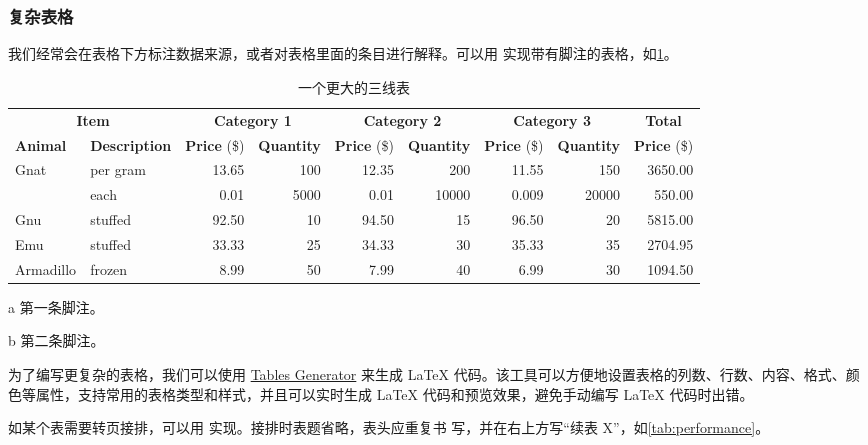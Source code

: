 \subsubsection{复杂表格}

我们经常会在表格下方标注数据来源，或者对表格里面的条目进行解释。可以用
 实现带有脚注的表格，如\cref{tab:bigtable}。

\begin{table}[!htbp]
\centering
\begin{threeparttable}[b]
\caption{一个更大的三线表}
\label{tab:bigtable}
\begin{tabular}{@{}llrrrrrrr@{}} \toprule
\multicolumn{2}{c}{\textbf{Item}} & \multicolumn{2}{c}{\textbf{Category 1}} & \multicolumn{2}{c}{\textbf{Category 2}} & \multicolumn{2}{c}{\textbf{Category 3}} & \multicolumn{1}{c}{\textbf{Total}} \\ \cmidrule(r){1-2} \cmidrule(lr){3-4} \cmidrule(lr){5-6} \cmidrule(lr){7-8} \cmidrule(l){9-9}
\textbf{Animal} & \textbf{Description} & \textbf{Price} (\$) & \textbf{Quantity} & \textbf{Price} (\$) & \textbf{Quantity} & \textbf{Price} (\$) & \textbf{Quantity} & \textbf{Price} (\$)\\ \midrule
Gnat & per gram\tnote{a} & 13.65 & 100 & 12.35 & 200 & 11.55 & 150 & 3650.00 \\
& each & 0.01 & 5000 & 0.01 & 10000 & 0.009 & 20000 & 550.00 \\
Gnu & stuffed & 92.50 & 10 & 94.50 & 15 & 96.50 & 20 & 5815.00 \\
Emu & stuffed & 33.33 & 25 & 34.33 & 30 & 35.33 & 35 & 2704.95 \\
Armadillo & frozen & 8.99 & 50 & 7.99 & 40 & 6.99 & 30\tnote{b} & 1094.50 \\ \bottomrule
\end{tabular}
\begin{tablenotes}
\item [a] 第一条脚注。
\item [b] 第二条脚注。
\end{tablenotes}
\end{threeparttable}
\end{table}

为了编写更复杂的表格，我们可以使用 \href{https://www.tablesgenerator.com/}{Tables Generator} 来生成 \LaTeX{} 代码。该工具可以方便地设置表格的列数、行数、内容、格式、颜色等属性，支持常用的表格类型和样式，并且可以实时生成 \LaTeX{} 代码和预览效果，避免手动编写 \LaTeX{} 代码时出错。


如某个表需要转页接排，可以用  实现。接排时表题省略，表头应重复书
写，并在右上方写“续表 X”，如\cref{tab:performance}。

